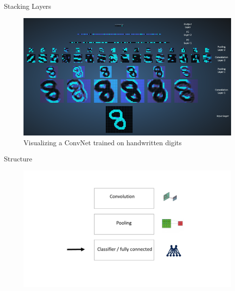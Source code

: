 \documentclass[12pt]{beamer}
\begin{document}
\begin{frame}{Stacking Layers}
\begin{figure}
\includegraphics[width = 1\linewidth]{images/chain.png}
\caption{Visualizing a ConvNet trained on handwritten digits}
\label{fig:principle}
\end{figure}

\end{frame}

\begin{frame}{Structure}
\begin{figure}
\includegraphics[width = 1\linewidth]{images/struct3.jpg}
\label{fig:principle}
\end{figure}
\end{frame}
\end{document}
